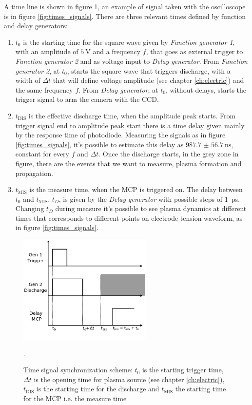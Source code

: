 A time line is shown in figure \ref{fig:times}, an example of signal taken with the oscilloscope is in figure \ref{fig:times_signals}. There are three relevant times defined by function and delay generators:
\begin{enumerate}
 \item $t_{0}$ is the starting time for the square wave given by \emph{Function generator 1}, with an amplitude of $\SI{5}{\volt}$ and a frequency $f$, that goes as external trigger to \emph{Function generator 2} and as voltage input to \emph{Delay generator}. From \emph{Function generator 2}, at $t_{0}$, starts the square wave that triggers discharge, with a width of $\Delta t$ that will define voltage amplitude (see chapter \ref{ch:electric}) and the same frequency $f$. From \emph{Delay generator}, at $t_{0}$, without delays, starts the trigger signal to arm the camera with the CCD.
 \item $t_{\text{DIS}}$ is the effective discharge time, when the amplitude peak starts. From trigger signal end to amplitude peak start there is a time delay given mainly by the response time of photodiode. Measuring the signals as in figure \ref{fig:times_signals}, it's possible to estimate this delay as $\SI{987.7(567)}{\nano\second}$, constant for every $f$ and $\Delta t$. Once the discharge starts, in the grey zone in figure, there are the events that we want to measure, plasma formation and propagation.
 \item $t_{\text{MIS}}$ is the measure time, when the MCP is triggered on. The delay between $t_{0}$ and $t_{\text{MIS}}$, $t_{D}$, is given by the \emph{Delay generator} with possible steps of \SI{1}{\pico\second}. Changing $t_{D}$ during measure it's possible to see plasma dynamics at different times that corresponds to different points on electrode tension waveform, as in figure \ref{fig:times_signals}.
\end{enumerate}
\begin{figure}
 \centering
 \includegraphics[width=0.6\textwidth]{Images/Shape/times.png}
 \caption{Time signal synchronization scheme: $t_{0}$ is the starting trigger time, $\Delta t$ is the opening time for plasma source (see chapter \ref{ch:electric}), $t_{\text{DIS}}$ is the starting time for the discharge and $t_{\text{MIS}}$ the starting time for the MCP i.e. the measure time}.
 \label{fig:times}
\end{figure}

